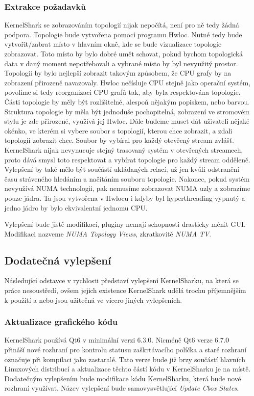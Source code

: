 \subsubsection*{Extrakce požadavků}
KernelShark se zobrazováním topologií nijak nepočítá, není pro ně tedy žádná podpora. Topologie bude vytvořena pomocí programu Hwloc. Nutné tedy bude vytvořit/zabrat místo v hlavním okně, kde se bude vizualizace topologie zobrazovat. Toto místo by bylo dobré umět schovat, pokud bychom topologická data v daný moment nepotřebovali a vybrané místo by byl nevyužitý prostor. Topologii by bylo nejlepší zobrazit takovým způsobem, že CPU grafy by na zobrazení přirozeně navazovaly. Hwloc nečísluje CPU stejně jako operační systém, povolíme si tedy reorganizaci CPU grafů tak, aby byla respektována topologie. Části topologie by měly být rozlišitelné, alespoň nějakým popiskem, nebo barvou. Struktura topologie by měla být jednoduše pochopitelná, zobrazení ve stromovém stylu je zde přirozené, využívá jej Hwloc. Dále budeme muset dát uživateli nějaké okénko, ve kterém si vybere soubor s topologií, kterou chce zobrazit, a zdali topologii zobrazit chce. Soubor by vybíral pro každý otevřený stream zvlášť. KernelShark nijak nevynucuje stejný trasovaný systém v otevřených streamech, proto dává smysl toto respektovat a vybírat topologie pro každý stream odděleně. Vylepšení by také mělo být součástí ukládaných relací, už jen kvůli odstranění času stráveného hledáním a načítáním souboru topologie. Nakonec, pokud systém nevyužívá NUMA technologii, pak nemusíme zobrazovat NUMA uzly a zobrazíme pouze jádra. Ta jsou vytvořena v Hwlocu i kdyby byl hyperthreading vypnutý a jedno jádro by bylo ekvivalentní jednomu CPU.

Vylepšení bude jistě modifikací, pluginy nemají schopnosti drasticky měnit GUI. Modifikaci nazveme \emph{NUMA Topology Views}, zkratkovitě \emph{NUMA TV}.

\subsection{Dodatečná vylepšení}

Následující odstavce v rychlosti představí vylepšení KernelSharku, na která se práce nesoustředí, ovšem jejich existence KernelShark udělá trochu příjemnějším k použití a nebo jsou užitečná ve vícero jiných vylepšeních.

\subsubsection*{Aktualizace grafického kódu}
KernelShark používá Qt6 v minimální verzi 6.3.0. Nicméně Qt6 verze 6.7.0 přináší nové rozhraní pro kontrolu statusu zaškrtávacího políčka a staré rozhraní označuje při kompilaci jako zastaralé. Tato verze bude již brzy součástí hlavních Linuxových distribucí a aktualizace těchto částí kódu v KernelSharku je na místě. Dodatečným vylepšením bude modifikace kódu KernelSharku, která bude nové rozhraní využívat. Název vylepšení bude samovysvětlující \emph{Update Cbox States}.

